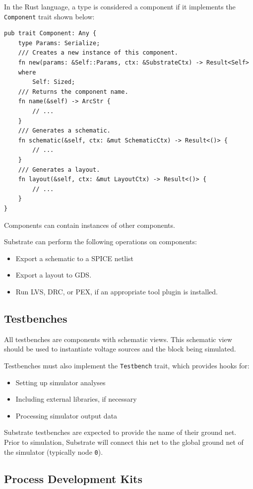In the Rust language, a type is considered a component if it implements the \verb|Component| trait shown below:

\begin{verbatim}
pub trait Component: Any {
    type Params: Serialize;
    /// Creates a new instance of this component.
    fn new(params: &Self::Params, ctx: &SubstrateCtx) -> Result<Self>
    where
        Self: Sized;
    /// Returns the component name.
    fn name(&self) -> ArcStr {
        // ...
    }
    /// Generates a schematic.
    fn schematic(&self, ctx: &mut SchematicCtx) -> Result<()> {
        // ...
    }
    /// Generates a layout.
    fn layout(&self, ctx: &mut LayoutCtx) -> Result<()> {
        // ...
    }
}
\end{verbatim}

Components can contain instances of other components.

Substrate can perform the following operations on components:
\begin{itemize}
\item Export a schematic to a SPICE netlist
\item Export a layout to GDS.
\item Run LVS, DRC, or PEX, if an appropriate tool plugin is installed.
\end{itemize}

\subsection{Testbenches}
All testbenches are components with schematic views. This schematic view should be used to instantiate voltage sources and the block being simulated.

Testbenches must also implement the \verb|Testbench| trait, which provides hooks for:
\begin{itemize}
\item Setting up simulator analyses
\item Including external libraries, if necessary
\item Processing simulator output data
\end{itemize}

Substrate testbenches are expected to provide the name of their ground net.
Prior to simulation, Substrate will connect this net to the global ground net of the simulator (typically node \verb|0|).

\subsection{Process Development Kits} \label{sec:pdks}

